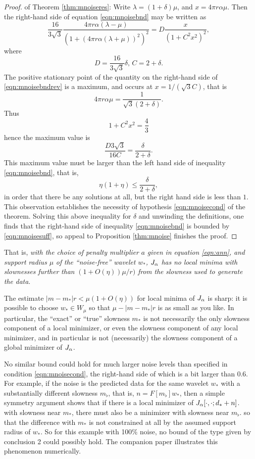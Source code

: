 \begin{proof} of Theorem \ref{thm:mnoiseres}:
  Write $\lambda = (1+\delta)\mu$, and $x=4 \pi r \alpha \mu$. Then
  the right-hand side of equation \ref{eqn:mnoisebnd} may be written as
  \begin{equation}
    \label{eqn:mnoisebndrev}
    \frac{16}{3\sqrt{3}}\frac{4\pi r \alpha
      (\lambda-\mu)}{(1+(4\pi r\alpha(\lambda+\mu))^2)^2} = D
    \frac{x}{(1+C^2 x^2)^2},
  \end{equation}
  where
  \[
    D=\frac{16}{3\sqrt{3}}\delta,\,C=2+\delta.
  \]
  The positive stationary point of the quantity on the right-hand side
  of \ref{eqn:mnoisebndrev} is a maximum, and occurs at
  $x=1/(\sqrt{3}C)$, that is
  \[
    4 \pi r \alpha \mu = \frac{1}{\sqrt{3}(2+\delta)}.
  \]
  Thus
  \[
    1+C^2x^2 = \frac{4}{3}
  \]
  hence the maximum value is
  \[
    \frac{D3\sqrt{3}}{16C} = \frac{\delta}{2+\delta}.
  \]
  This maximum value must be larger than the left hand side of inequality
  \ref{eqn:mnoisebnd}, that is,
  \[
    \eta(1+\eta) \le \frac{\delta}{2+\delta},
  \]
  in order that there be any solutions at all, but the right hand side
  is less than $1$. This observation establishes the necessity of
  hypothesis \ref{eqn:mnoisecond} of the
  theorem. Solving this above inequality for $\delta$ and unwinding
  the definitions, one finds that the right-hand side of inequality
  \ref{eqn:mnoisebnd} is bounded by \ref{eqn:mnoisesuff}, so appeal to
  Proposition \ref{thm:mnoise} finishes the proof.
\end{proof}

 That is, {\em with the choice of penalty
  multiplier $a$ given in equation \ref{eqn:ann}, and support radius
  $\mu$ of the ``noise-free'' wavelet $w_*$, $J_{\alpha}$ has no local
  minima with slownesses further than $(1+O(\eta))\mu/r)$ from the slowness used to
  generate the data}.

 The estimate $|m-m_*|r<\mu(1+O(\eta))$ for
local minima of $J_{\alpha}$ is sharp: it is possible to choose $w_* \in W_{\mu}$
so that $\mu - |m-m_*|r$ is as small as you like. In particular,
the ``exact'' or ``true'' slowness $m_*$ is not necessarily the only
slowness component of a local minimizer, or even the slowness
component of any local minimizer, and in particular
is not (necessarily) the slowness component of a global minimizer of $J_{\alpha}$.

 No similar bound could hold for much larger
noise levels than specified in condition \ref{eqn:mnoisecond}, the
right-hand side of which is a bit larger than 0.6. For example, if the noise is
the predicted data for the same wavelet $w_*$ with a substantially different
slowness $m_{\flat}$, that is, $n=F[m_{\flat}]w_*$, then a simple
symmetry argument shows that if there is a local minimizer of $J_{\alpha}[\cdot,\cdot;d_*+n]$. with
slowness near $m_*$,
there must also be a minimizer with slowness near $m_{\flat}$.
so that the difference with $m_*$ is not constrained at
all by the assumed support radius of $w_*$. So for this example with 100\% noise, no
bound of the type given by conclusion 2 could possibly hold. The
companion paper \cite[]{SymesChenMinkoff:21}
illustrates this phenomenon numerically.

